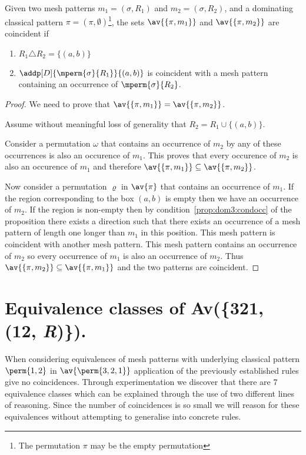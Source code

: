 \begin{proposition}
    \label{prop:dom3}
    Given two mesh patterns \(m_1 =(\sigma, R_1)\) and \(m_2 = (\sigma, R_2)\),
    and a dominating classical pattern \(\pi = (\pi,\emptyset)\)\footnote{The
    permutation \(\pi\) may be the empty permutation}, the sets
    \(\av{\{\pi,m_1\}}\) and \(\av{\{\pi,m_2\}}\) are coincident if
    \begin{enumerate}
        \item \(R_1 \triangle R_2 = \{(a,b)\}\)
        \item\label{prop:dom3:condocc} \(\addp[D]{\mperm{\sigma}{R_1}}{(a,b)}\)
            is coincident with a mesh pattern containing an occurrence of
            \(\mperm{\sigma}{R_2}\).
    \end{enumerate}
\end{proposition}
\begin{proof}
    We need to prove that \(\av{\{\pi,m_1\}} = \av{\{\pi,m_2\}}\).

    Assume without meaningful loss of generality that \(R_2 = R_1 \cup \{(a,b)\}\).

    Consider a permutation \(\omega\) that contains an occurrence of \(m_2\)
    by  any of these occurrences is also an occurence
    of \(m_1\). This proves that every occurence of \(m_2\) is also an
    occurence of \(m_1\) and therefore \(\av{\{\pi,m_1\}} \subseteq \av{\{\pi,m_2\}}\).

    Now consider a permutation \(\varrho\) in \(\av{\pi}\) that contains an
    occurrence of \(m_1\). If the region corresponding to the box \((a,b)\)
    is empty then we have an occurrence of \(m_2\). If the region is non-empty
    then by condition~\ref{prop:dom3:condocc}  of the proposition there exists
    a direction such that there exists an occurrence of a mesh pattern of
    length one longer than \(m_1\) in this position. This mesh pattern is
    coincident with another mesh pattern. This mesh pattern contains an
    occurrence of \(m_2\) so every occurrence of \(m_1\) is also an occurrence
    of \(m_2\).  Thus \(\av{\{\pi,m_2\}} \subseteq \av{\{\pi,m_1\}}\) and the
    two patterns are coincident.
\end{proof}

\section{Equivalence classes of Av(\{321, (12, \textit{R})\}).}
When considering equivalences of mesh patterns with underlying classical
pattern \(\perm{1,2}\) in \(\av{\perm{3,2,1}}\) application of the previously
established rules give no coincidences. Through experimentation we discover
that there are \(7\) equivalence classes which can be explained through the
use of two different lines of reasoning. Since the number of coincidences is
so small we will reason for these equivalences without attempting to generalise
into concrete rules.

